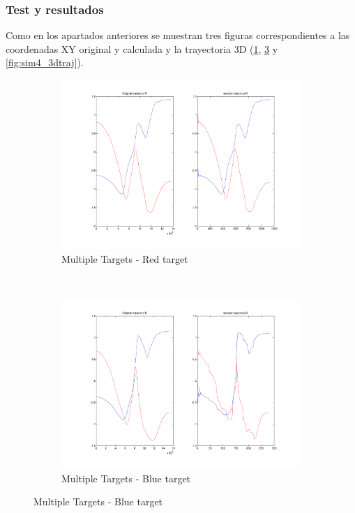 \subsubsection{Test y resultados}

	Como en los apartados anteriores se muestran tres figuras correspondientes a las coordenadas XY original y calculada y la trayectoria 3D (\ref{fig:sim4_redtarget}, \ref{fig:sim4_bluetarget} y \ref{fig:sim4_3dtraj}). \\
	
	\begin{figure}[hp]
		\centering
		\begin{subfigure}[hp]{0.45\linewidth}
			\centering
			\includegraphics[width=\linewidth]{../Images/c3/sim4_redtarget}
			\caption{Multiple Targets - Red target}
			\label{fig:sim4_redtarget}	
		\end{subfigure}
		~
		\begin{subfigure}[hp]{0.45\linewidth}
			\centering
			\includegraphics[width=\linewidth]{../Images/c3/sim4_bluetarget}
			\caption{Multiple Targets - Blue target}
			\label{fig:sim4_bluetarget}
		\end{subfigure}
	\end{figure}
	
